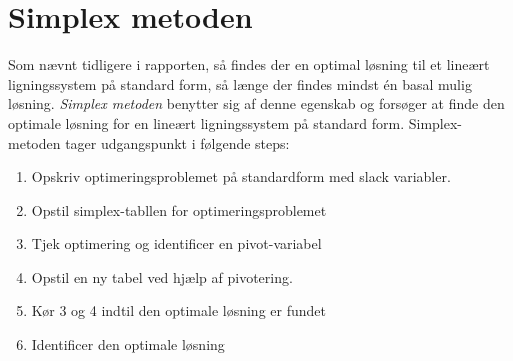 \chapter{Simplex metoden}
\label{coronaaaaaaaaaaa}
Som nævnt tidligere i rapporten, så findes der en optimal løsning til et lineært ligningssystem på standard form, så længe der findes mindst én basal mulig løsning. 
\textit{Simplex metoden} benytter sig af denne egenskab og forsøger at finde den optimale løsning for en lineært ligningssystem på standard form.
%
%
%
%
%
%
%
%
%
Simplex-metoden tager udgangspunkt i følgende steps: 
%
\begin{col}{}{}
%
\begin{enumerate}
\item Opskriv optimeringsproblemet på standardform med slack variabler.  %
\item Opstil simplex-tabllen for optimeringsproblemet					 %
\item Tjek optimering og identificer en pivot-variabel					 %
\item Opstil en ny tabel ved hjælp af pivotering. 						 %
\item Kør 3 og 4 indtil den optimale løsning er fundet 					 %
\item Identificer den optimale løsning									 %
\end{enumerate}
%
\end{col}
